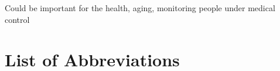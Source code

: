 \documentclass[conference]{IEEEtran}
\begin{document}
Could be important for the health, aging, monitoring people under medical control

\section*{List of Abbreviations}
\begin{acronym}[XXXXXXXX]
\end{acronym}



%
\end{document}
